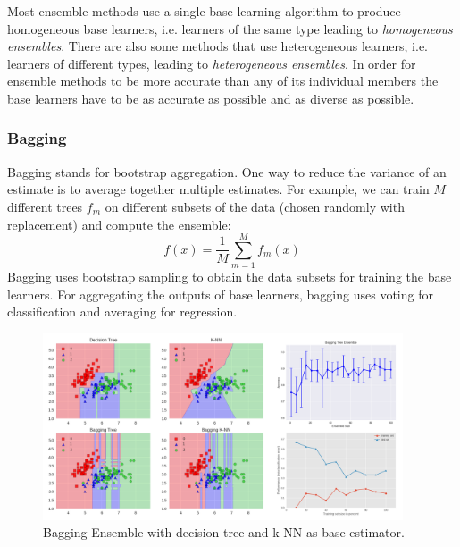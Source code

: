 Most ensemble methods use a single base learning algorithm to produce homogeneous base learners, i.e. learners of the same type leading to \textit{homogeneous ensembles}. There are also some methods that use heterogeneous learners, i.e. learners of different types, leading to \textit{heterogeneous ensembles}. In order for ensemble methods to be more accurate than any of its individual members the base learners have to be as accurate as possible and as diverse as possible. \\

\subsubsection{Bagging}

Bagging stands for bootstrap aggregation. One way to reduce the variance of an estimate is to average together multiple estimates. For example, we can train $M$ different trees $f_m$ on different subsets of the data (chosen randomly with replacement) and compute the ensemble:
\begin{equation}
   f(x) = \frac{1}{M}\sum_{m=1}^{M}f_m(x)
\end{equation}
Bagging uses bootstrap sampling to obtain the data subsets for training the base learners. For aggregating the outputs of base learners, bagging uses voting for classification and averaging for regression.

\begin{figure}[tbhp]
    \centering
    \includegraphics[width=0.95\textwidth, trim={10 10 10 10}]{figures/ensemble_bagging_merged.png}
    \caption{Bagging Ensemble with decision tree and k-NN as base estimator.}
    \label{fig:ensemble_bagging}
\end{figure}

